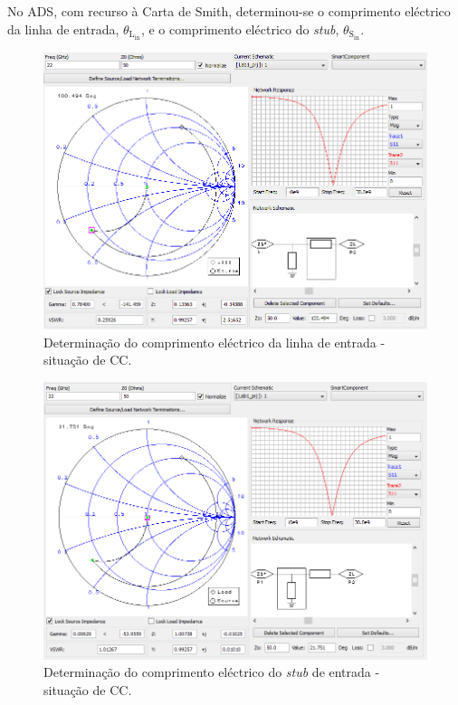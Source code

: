 \documentclass[11pt]{article}
\numberwithin{equation}{section}
\begin{document}
No ADS, com recurso à Carta de Smith, determinou-se o comprimento eléctrico da linha de entrada, $\theta_{\text{L}_{\text{in}}}$, e o comprimento eléctrico do \textit{stub}, $\theta_{\text{S}_{\text{in}}}$. 

\begin{figure}[H]
	\centering
	\includegraphics[keepaspectratio=true, scale=0.45]{exps/Gerador_cc_line}
	\vspace{-0.5em}
	\caption{Determinação do comprimento eléctrico da linha de entrada - situação de CC.}
	\vspace{-0.8em}
\end{figure}

\begin{figure}[H]
	\centering
	\includegraphics[keepaspectratio=true, scale=0.45]{exps/Gerador_cc_stub}
	\vspace{-0.5em}
	\caption{Determinação do comprimento eléctrico do \textit{stub} de entrada - situação de CC.}
	\vspace{-0.8em}
\end{figure}
\end{document}
